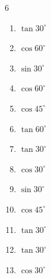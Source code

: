 \begin{multicols}{6}
\begin{enumerate}
  \item $\displaystyle \tan{30^\circ}$


  \item $\displaystyle \cos{60^\circ}$


  \item $\displaystyle \sin{30^\circ}$


  \item $\displaystyle \cos{60^\circ}$


  \item $\displaystyle \cos{45^\circ}$


  \item $\displaystyle \tan{60^\circ}$


  \item $\displaystyle \tan{30^\circ}$


  \item $\displaystyle \cos{30^\circ}$


  \item $\displaystyle \sin{30^\circ}$


  \item $\displaystyle \cos{45^\circ}$


  \item $\displaystyle \tan{30^\circ}$


  \item $\displaystyle \tan{30^\circ}$


  \item $\displaystyle \cos{30^\circ}$


\end{enumerate}
\end{multicols}
